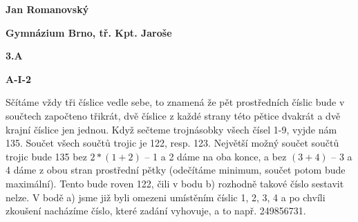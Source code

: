 \documentclass{article}
\title{\vspace{-2cm}\vspace{-1.7cm}}
\date{}
\author{}
\begin{document}
\maketitle
\noindent \textbf{Jan Romanovský}

\noindent \textbf{Gymnázium Brno, tř. Kpt. Jaroše}

\noindent \textbf{3.A}

\noindent \textbf{A-\textrm{I}-2}

\textbf{ }

Sčítáme vždy tři číslice vedle sebe, to znamená že pět prostředních číslic bude v součtech započteno třikrát, dvě číslice z každé strany této pětice dvakrát a dvě krajní číslice jen jednou. Když sečteme trojnásobky všech čísel 1-9, vyjde nám 135. Součet všech součtů trojic je 122, resp. 123. Největší možný součet součtů trojic bude 135 bez $2*(1+2)$ -- 1 a 2 dáme na oba konce, a bez $(3+4)$ -- 3 a 4 dáme z obou stran prostřední pětky (odečítáme minimum, součet potom bude maximální). Tento bude roven 122, čili v bodu b) rozhodně takové číslo sestavit nelze. V bodě a) jsme již byli omezeni umístěním číslic 1, 2, 3, 4 a po chvíli zkoušení nacházíme číslo, které zadání vyhovuje, a to např. 249856731.
\end{document}
